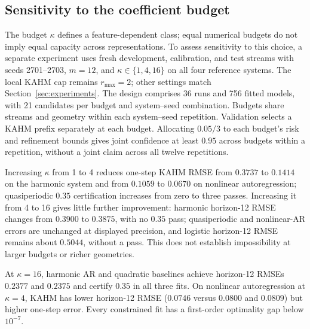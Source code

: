 \subsection{Sensitivity to the coefficient budget}
\label{sec:budget-sensitivity}

The budget $\kappa$ defines a feature-dependent class; equal numerical budgets
do not imply equal capacity across representations. To assess sensitivity to
this choice, a separate experiment uses fresh development, calibration, and
test streams with seeds 2701--2703, $m=12$, and $\kappa\in\{1,4,16\}$ on all
four reference systems. The local KAHM cap remains $r_{\max}=2$;
other settings match Section~\ref{sec:experiments}. The
design comprises 36 runs and 756 fitted models, with 21 candidates per
budget and system--seed combination. Budgets share streams and geometry
within each system--seed repetition. Validation selects a KAHM prefix
separately at each budget. Allocating $0.05/3$ to each budget's risk and
refinement bounds gives joint confidence at least $0.95$ across budgets
within a repetition, without a joint claim across all twelve repetitions.

\begin{table}[t]
  \centering
  \small
  \setlength{\tabcolsep}{4pt}
  
  \caption{Budget sensitivity: mean test RMSE and feature count over three
  new fitting seeds. ``Passes'' counts validation-selected KAHM models
  certified at tolerance $0.35$ simultaneously for $h=1,4,12$. The confidence
  allocation covers all three budgets within each system--seed repetition.}
  \label{tab:budget}
\end{table}

Increasing $\kappa$ from 1 to 4 reduces one-step KAHM RMSE from $0.3737$ to
$0.1414$ on the harmonic system and from $0.1059$ to $0.0670$ on nonlinear
autoregression; quasiperiodic $0.35$ certification increases from zero to three
passes. Increasing it from 4 to 16 gives little further improvement:
harmonic horizon-12 RMSE changes from $0.3900$ to $0.3875$, with no $0.35$
pass; quasiperiodic and nonlinear-AR errors are unchanged at displayed
precision, and logistic horizon-12 RMSE remains about $0.5044$, without a pass.
This does not establish impossibility at larger budgets or richer geometries.

At $\kappa=16$, harmonic AR and quadratic baselines achieve horizon-12 RMSEs
$0.2377$ and $0.2375$ and certify $0.35$ in all three fits. On nonlinear
autoregression at $\kappa=4$, KAHM has lower horizon-12 RMSE ($0.0746$ versus
$0.0800$ and $0.0809$) but higher one-step error. Every constrained fit has
a first-order optimality gap below $10^{-7}$.
